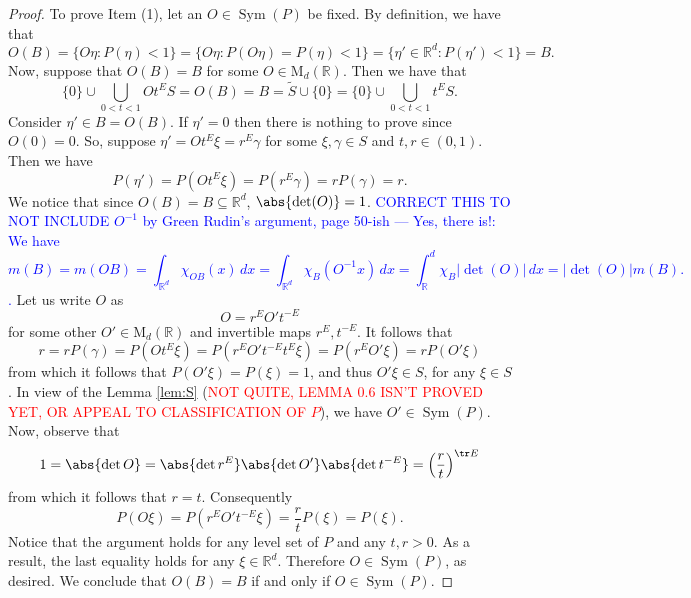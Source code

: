 \documentclass{article}
\theoremstyle{definition}
\newcommand\MdR{\mbox{M}_d(\mathbb{R})}
\newcommand\Sym{\operatorname{Sym}}
\renewcommand\det{\operatorname{det}}
\newcommand{\R}{\mathbb{R}}
\newcommand{\f}[2]{\frac{#1}{#2}}
\newcommand{\lp}{\left(}
\newcommand{\rp}{\right)}
\theoremstyle{theorem}
\begin{document}
\begin{framed}
\begin{proof}
To prove Item (1), let an $O\in \Sym{(P)}$ be fixed. By definition, we have that
\begin{equation*}
    O(B) = \{ O \eta : P(\eta) < 1 \} = \{ O \eta : P(O\eta) = P(\eta) < 1 \} = \{ \eta'\in \R^d : P(\eta') < 1 \} = B.
\end{equation*}
Now, suppose that $O(B) = B$ for some $O\in \MdR{}$. Then we have that
\begin{equation*}
    \{0 \} \cup \bigcup_{0<t<1} O t^E S = O(B) = B = \widetilde{S}\cup \{ 0 \} = \{ 0 \} \cup \bigcup_{0<t<1}t^E S.
\end{equation*}
Consider $\eta'\in B = O(B)$. If $\eta' = 0$ then there is nothing to prove since $O(0) = 0$. So, suppose $\eta'=Ot^E \xi = r^E \gamma$ for some $\xi,\gamma\in S$ and $t,r\in (0,1)$. Then we have
\begin{equation*}
    P(\eta') = P(Ot^E \xi) = P(r^E\gamma) = rP(\gamma)=r.
\end{equation*}
We notice that since $O(B)=B \subseteq \R^d$, $\abs{\det(O)}=1$. \textcolor{blue}{CORRECT THIS TO NOT INCLUDE $O^{-1}$ by Green Rudin's argument, page 50-ish --- Yes, there is!: We have
\begin{equation*}
m(B)=m(OB)=\int_{\mathbb{R}^d}\chi_{OB}(x)\,dx=\int_{\mathbb{R}^d}\chi_B(O^{-1}x)\,dx=\int_\mathbb{R}^d\chi_{B}|\det(O)|\,dx=|\det(O)|m(B). 
\end{equation*}. }
Let us write $O$ as
\begin{equation*}
    O = r^{E} O' t^{-E}
\end{equation*}
for some other $O'\in \MdR{}$ and invertible maps $r^E,t^{-E}$. It follows that 
\begin{equation*}
    r = rP(\gamma) =P(Ot^E \xi) = P(r^{E} O' t^{-E}t^E \xi) = P(r^E O' \xi)  = rP(O' \xi)
\end{equation*}
from which it follows that $P(O' \xi) = P(\xi) = 1$, and thus $O' \xi \in S$, for any $\xi\in S$. In view of the Lemma \ref{lem:S} (\textcolor{red}{NOT QUITE, LEMMA 0.6 ISN'T PROVED YET, OR APPEAL TO CLASSIFICATION OF $P$}), we have $O' \in \Sym(P)$.  Now, observe that
\begin{equation*}
    1 = \abs{\det{O}} = \abs{\det{r^E}}\abs{\det{O'}}\abs{\det{t^{-E}}} = \lp\f{r}{t}\rp^{\tr E} 
\end{equation*}
from which it follows that $r=t$. Consequently
\begin{equation*}
    P(O \xi) = P(r^E O' t^{-E} \xi) = \frac{r}{t} P(\xi) = P(\xi).
\end{equation*}
Notice that the argument holds for any level set of $P$ and any $t,r>0$. As a result, the last equality holds for any $\xi\in \R^d$. Therefore $O\in \Sym(P)$, as desired. We conclude that $O(B) = B$ if and only if $O\in \Sym(P)$.



\end{proof}
\end{framed}
\end{document}
